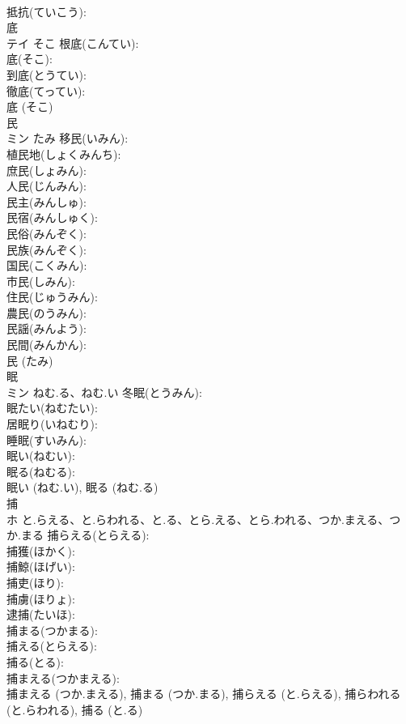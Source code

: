 \documentclass[8pt]{extreport}
\begin{document}
\begin{CJK}{UTF8}{min}
\\	抵抗(ていこう): 
\\	底			
\\	テイ	そこ	根底(こんてい): 
\\	底(そこ): 
\\	到底(とうてい): 
\\	徹底(てってい): 
\\	底 (そこ)
\\	民			
\\	ミン	たみ	移民(いみん): 
\\	植民地(しょくみんち): 
\\	庶民(しょみん): 
\\	人民(じんみん): 
\\	民主(みんしゅ): 
\\	民宿(みんしゅく): 
\\	民俗(みんぞく): 
\\	民族(みんぞく): 
\\	国民(こくみん): 
\\	市民(しみん): 
\\	住民(じゅうみん): 
\\	農民(のうみん): 
\\	民謡(みんよう): 
\\	民間(みんかん): 
\\	民 (たみ)
\\	眠			
\\	ミン	ねむ.る、ねむ.い	冬眠(とうみん): 
\\	眠たい(ねむたい): 
\\	居眠り(いねむり): 
\\	睡眠(すいみん): 
\\	眠い(ねむい): 
\\	眠る(ねむる): 
\\	眠い (ねむ.い), 眠る (ねむ.る)
\\	捕			
\\	ホ	と.らえる、と.らわれる、と.る、とら.える、とら.われる、つか.まえる、つか.まる	捕らえる(とらえる): 
\\	捕獲(ほかく): 
\\	捕鯨(ほげい): 
\\	捕吏(ほり): 
\\	捕虜(ほりょ): 
\\	逮捕(たいほ): 
\\	捕まる(つかまる): 
\\	捕える(とらえる): 
\\	捕る(とる): 
\\	捕まえる(つかまえる): 
\\	捕まえる (つか.まえる), 捕まる (つか.まる), 捕らえる (と.らえる), 捕らわれる (と.らわれる), 捕る (と.る)

\end{CJK}
\end{document}
